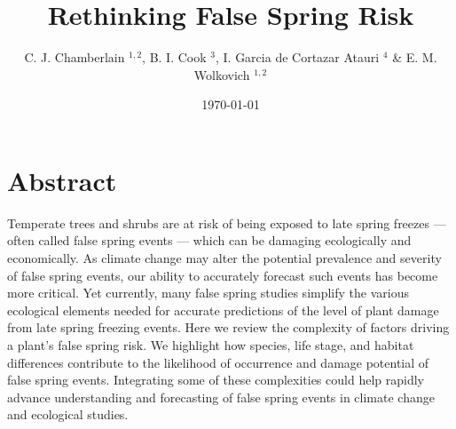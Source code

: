 \documentclass{article}\usepackage[]{graphicx}\usepackage[]{color}
\begin{document}
\title{Rethinking False Spring Risk}
\author{C. J. Chamberlain $^{1,2}$, B. I. Cook $^{3}$, I. Garcia de Cortazar Atauri $^{4}$ \& E. M. Wolkovich $^{1,2}$}
\date{\today}
\maketitle 
 

\renewcommand{\thetable}{\arabic{table}}
\renewcommand{\thefigure}{\arabic{figure}}
\renewcommand{\labelitemi}{$-$}



\section{Abstract}
Temperate trees and shrubs are at risk of being exposed to late spring freezes --- often called false spring events --- which can be damaging ecologically and economically. As climate change may alter the potential prevalence and severity of false spring events, our ability to accurately forecast such events has become more critical. Yet currently, many false spring studies simplify the various ecological elements needed for accurate predictions of the level of plant damage from late spring freezing events. Here we review the complexity of factors driving a plant's false spring risk. We highlight how species, life stage, and habitat differences contribute to the likelihood of occurrence and damage potential of false spring events. %
Integrating some of these complexities could help rapidly advance understanding and forecasting of false spring events in climate change and ecological studies.
\end{document}

